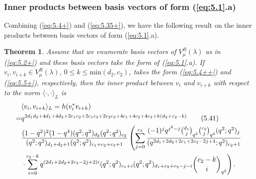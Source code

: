 \documentclass[table,a4paper,reqno]{amsart}
\numberwithin{equation}{section}
\newtheorem{theorem}{Theorem}[section]
\theoremstyle{definition}
\begin{document}
\subsubsection{Inner products between basis vectors of form (\ref{eq:5.1}.a)}
Combining (\ref{eq:5.4+}) and (\ref{eq:5.35+}), we have the following result on the inner products between basis vectors of form (\ref{eq:5.1}.a).
\begin{theorem}
    Assume that we enumerate basis vectors of $V^R_\mu(\lambda)$ as in (\ref{eq:5.2+}) and these basis vectors take the form of (\ref{eq:5.1}.a). If $v_i,v_{i+k}\in V^R_\mu(\lambda)$, $0\le k\le\text{min}(d_2,c_2)$, takes the form (\ref{eq:5.4++}) and (\ref{eq:5.5+}), respectively, then the inner product between $v_i$ and $v_{i+k}$ with respect to the norm $\langle\cdot,\cdot\rangle_L$ is
    \begin{align}\stepcounter{equation}
            &\langle v_{i},v_{i+k}\rangle_L=h(v^*_iv_{i+k})\notag\\
            =&q^{2d_1d_2+4d_1+4d_2+2c_1c_2+2c_1c_3+2c_2c_3+4c_1+4c_2+4c_3+k(d_2+c_2-k)}\tag{5.41}\\
            &\frac{(1-q^2)^2(1-q^4)(q^2;q^2)_{d_2}(q^2;q^2)_{c_2}}{(q^2;q^2)_{d_1+d_2+1}(q^2;q^2)_{c_1+c_2+c_3+1}}\left(\sum_{j=0}^{c_3}\frac{(-1)^{j}q^{j^2-j}{d_1\choose j}_{q^{2}}{c_3\choose j}_{q^2}(q^2;q^2)_{j}}{(q^{2d_1+2d_2+2c_1+2c_3-2j+4};q^2)_{c_2+1}}\right.\notag\\
            &\left.\cdot\sum_{i=0}^{c_2-k}q^{(2d_1+2d_2+2c_3-2j+2)i}(q^2;q^2)_{c_1+i}(q^2;q^2)_{d_1+c_2+c_3-j-i}{c_2-k\choose i}_{q^2}\right).\notag
    \end{align}
\end{theorem}
\end{document}
